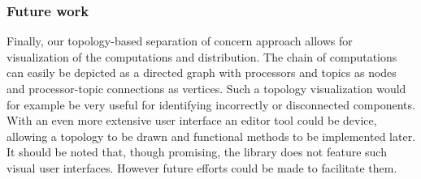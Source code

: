 \subsubsection*{Future work}
Finally, our topology-based separation of concern approach allows for visualization of the computations and distribution. The chain of computations can easily be depicted as a directed graph with processors and topics as nodes and processor-topic connections as vertices. Such a topology visualization would for example be very useful for identifying incorrectly or disconnected components. With an even more extensive user interface an editor tool could be device, allowing a topology to be drawn and functional methods to be implemented later. It should be noted that, though promising, the library does not feature such visual user interfaces. However future efforts could be made to facilitate them.



	







